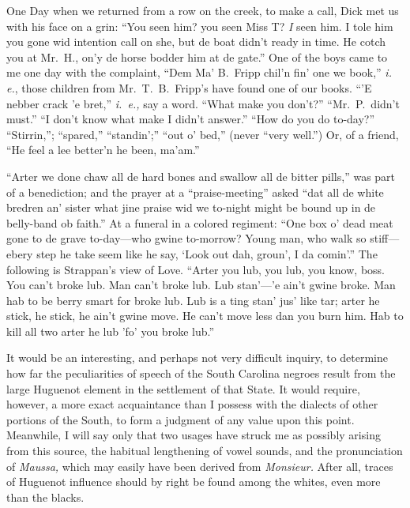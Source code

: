 \documentclass[a5paper,10pt]{book}
\begin{document}
One Day when we returned from a row on the creek, to make a call, Dick
met us with his face on a grin: ``You seen him?  you seen Miss T?
\emph{I} seen him.  I tole him you gone wid intention call on she, but
de boat didn't ready in time.  He cotch you at Mr.~H., on'y de horse
bodder him at de gate.''  One of the boys came to me one day with the
complaint, ``Dem Ma' B.~Fripp chil'n fin' one we book,'' \emph{i. e.},
those children from Mr.~T.~B.~Fripp's have found one of our books.
``'E nebber crack 'e bret,'' \emph{i.~e.,} say a word.  ``What make
you don't?''  ``Mr.~P.~didn't must.''  ``I don't know what make I
didn't answer.''  ``How do you do to-day?''  ``Stirrin,''; ``spared,''
``standin';'' ``out o' bed,'' (never ``very well.'')  Or, of a friend,
``He feel a lee better'n he been, ma'am.''

``Arter we done chaw all de hard bones and swallow all de bitter
pills,'' was part of a benediction; and the prayer at a
``praise-meeting'' asked ``dat all de white bredren an' sister what
jine praise wid we to-night might be bound up in de belly-band ob
faith.''  At a funeral in a colored regiment: ``One box o' dead meat
gone to de grave to-day---who gwine to-morrow?  Young man, who walk so
stiff---ebery step he take seem like he say, `Look out dah, groun', I
da comin'.''  The following is Strappan's view of Love.  ``Arter you
lub, you lub, you know, boss.  You can't broke lub.  Man can't broke
lub.  Lub stan'---'e ain't gwine broke.  Man hab to be berry smart for
broke lub.  Lub is a ting stan' jus' like tar; arter he stick, he
stick, he ain't gwine move.  He can't move less dan you burn him.  Hab
to kill all two arter he lub 'fo' you broke lub.''

It would be an interesting, and perhaps not very difficult inquiry, to
determine how far the peculiarities of speech of the South Carolina
negroes result from the large Huguenot element in the settlement of
that State.  It would require, however, a more exact acquaintance than
I possess with the dialects of other portions of the South, to form a
judgment of any value upon this point.  Meanwhile, I will say only
that two usages have struck me as possibly arising from this source,
the habitual lengthening of vowel sounds, and the pronunciation of
\emph{Maussa,} which may easily have been derived from
\emph{Monsieur.}  After all, traces of Huguenot influence should by
right be found among the whites, even more than the blacks.

\begin{flushright}
[W.~F.~A.]
\end{flushright}
\end{document}
